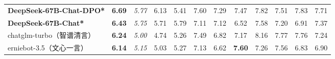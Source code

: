 \documentclass[11pt, a4paper, logo, copyright, nonumbering]{deepseek}
\begin{document}
\begin{CJK*}{UTF8}{gbsn}
\begin{table}[t]
{\begin{tabular}{@{}l|c|ccc|ccccccc@{}}
\textbf{DeepSeek-67B-Chat-DPO*}              & \textbf{6.69}                     & \multicolumn{1}{c|}{\textit{5.77}}                                   & 6.13                                            & 5.41                                            & \multicolumn{1}{c|}{7.60}                                            & 7.29                                            & 7.47                                            & 7.82                                            & 7.51                                            & 7.83                                            & 7.71                     \\                       
\textbf{DeepSeek-67B-Chat*}              & \textbf{6.43}                     & \multicolumn{1}{c|}{\textit{5.75}}                                   & 5.71                                            & 5.79                                            & \multicolumn{1}{c|}{7.11}                                            & 7.12                                            & 6.52                                            & 7.58                                            & 7.20                                            & 6.91                                            & 7.37                                            \\
chatglm-turbo（智谱清言）         & \textbf{6.24}                     & \multicolumn{1}{c|}{\textit{5.00}}                                   & 4.74                                            & 5.26                                            & \multicolumn{1}{c|}{7.49}                                            & 6.82                                            & 7.17                                            & 8.16                                            & 7.77                                            & 7.76                                            & 7.24                                            \\
erniebot-3.5（文心一言）          & \textbf{6.14}                     & \multicolumn{1}{c|}{\textit{5.15}}                                   & 5.03                                            & 5.27                                            & \multicolumn{1}{c|}{7.13}                                            & 6.62                                            & \textbf{7.60}                                            & 7.26                                            & 7.56                                            & 6.83                                            & 6.90                                            \\

\end{tabular}}
\end{table}
\end{CJK*}
\end{document}
